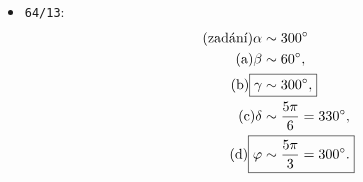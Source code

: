 \documentclass[a4paper, 11pt]{article}
\begin{document}
\begin{itemize}
		\item {\texttt{64/13}}:
			\begin{align}
				\tag{zadání}
				\alpha &\sim 300\degree
			\\
				\tag{a}
				\beta &\sim 60\degree,
			\\
				\tag{b}
				\Aboxed{\gamma &\sim 300\degree,}
			\\
				\tag{c}
				\delta &\sim \frac{5\pi}{6} = 330\degree,
			\\
				\tag{d}
				\Aboxed{\varphi &\sim \frac{5\pi}{3} = 300\degree.}
			\end{align}
		
	\end{itemize}
	
\end{document}

